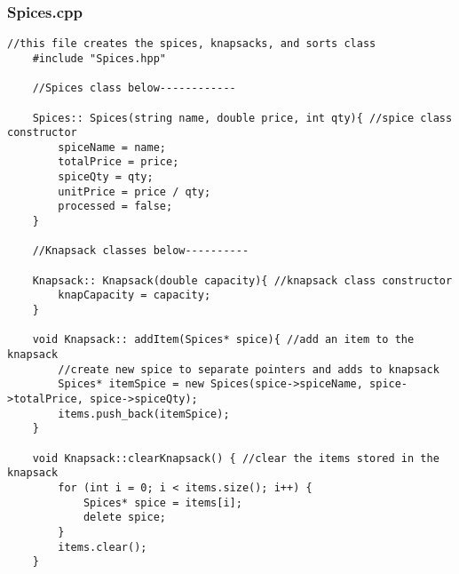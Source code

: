 \documentclass[letterpaper, 10pt,DIV=13]{scrartcl}
\numberwithin{equation}{section} %
\numberwithin{figure}{section} %
\numberwithin{table}{section} %
\begin{document}
\subsubsection*{Spices.cpp}
    \lstset{numbers=left, numberstyle=\tiny, stepnumber=1, numbersep=5pt, basicstyle=\footnotesize\ttfamily}
    \begin{lstlisting}[frame=single, ]
    //this file creates the spices, knapsacks, and sorts class
    #include "Spices.hpp"
    
    //Spices class below------------
    
    Spices:: Spices(string name, double price, int qty){ //spice class constructor
        spiceName = name;
        totalPrice = price;
        spiceQty = qty;
        unitPrice = price / qty;
        processed = false;
    }
    
    //Knapsack classes below----------
    
    Knapsack:: Knapsack(double capacity){ //knapsack class constructor
        knapCapacity = capacity;
    }
    
    void Knapsack:: addItem(Spices* spice){ //add an item to the knapsack
        //create new spice to separate pointers and adds to knapsack
        Spices* itemSpice = new Spices(spice->spiceName, spice->totalPrice, spice->spiceQty);
        items.push_back(itemSpice);
    }
    
    void Knapsack::clearKnapsack() { //clear the items stored in the knapsack
        for (int i = 0; i < items.size(); i++) {
            Spices* spice = items[i];
            delete spice;
        }
        items.clear();
    }
    

\end{lstlisting}
\end{document}
